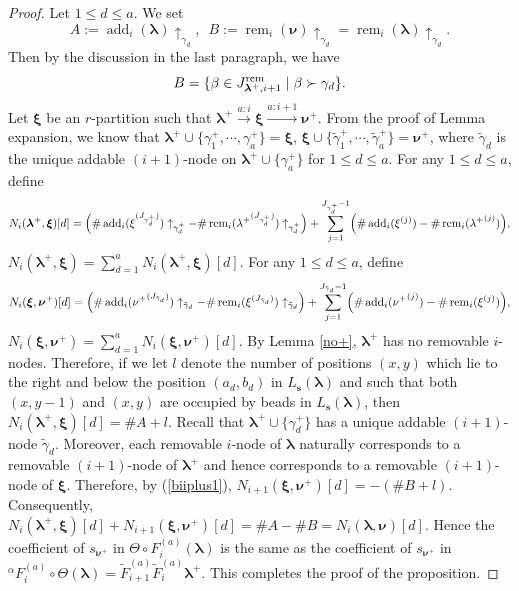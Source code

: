 \documentclass[a4paper,10pt]{amsart}
\theoremstyle{plain}
\def\bs{{\boldsymbol{s}}}
\def\bxi{{\boldsymbol \xi}}
\def\blam{{\boldsymbol \lambda}}
\def\bnu{{\boldsymbol \nu}}
\newcommand{\add}{\operatorname{add}}
\newcommand{\rem}{\operatorname{rem}}
\theoremstyle{plain}
\numberwithin{equation}{section}
\newenvironment{equa}
  {\refstepcounter{theorem}%
   \renewcommand\theequation{\thetheorem}%
   \begin{equation}}
  {\end{equation}}
\begin{document}
\begin{proof}
Let $1\leq d\leq a$. We set $$
A:=\add_i(\blam)\uparrow_{\gamma_d},\,\,\, B:=\rem_{i}(\bnu)\uparrow_{\gamma_d}=\rem_{i}(\blam) \uparrow_{\gamma_d}. $$
Then by the discussion in the last paragraph, we have \begin{equa}\label{biiplus1}B=\{\beta\in J_{\blam^+,i+1}^{\rm{rem}}\mid\beta\succ{\gamma_d}\}.\end{equa} Let $\bxi$ be an $r$-partition such that $\blam^+\xrightarrow{a:i} \bxi \xrightarrow{a:i+1} \bnu^+$.
From the proof of Lemma {expansion}, we know that $\blam^+\cup \{\gamma^+_1, \cdots, \gamma^+_a\}=\bxi$, $\bxi\cup \{\tilde \gamma^+_1, \cdots, \tilde \gamma^+_a\}=\bnu^+$, where $\tilde \gamma_d$ is the unique addable $(i+1)$-node on $\blam^+\cup \{\gamma^+_a\}$ for $1\le d\le a$.
For any $1\le d\le a$, define
$$N_i(\blam^+, \bxi)[d]=\Bigl(\#\add_i (\xi^{(J_{\gamma^+_d})} )\uparrow_{\gamma^+_d}-\#\rem_i ({\lambda^+}^{(J_{\gamma^+_d})})\uparrow_{\gamma^+_d}\Bigr)+ \sum^{J_{\gamma^+_d}-1}_{j=1}\Bigl(\#\add_i (\xi^{(j)})-\#\rem_i ({\lambda^+}^{(j)})\Bigr),$$
$N_i(\blam^+, \bxi)=\sum_{d=1}^a N_i(\blam^+, \bxi)[d].$
For any $1\le d\le a$, define
$$N_i(\bxi, \bnu^+)[d]=\Bigl(\#\add_i ({\nu^+}^{(J_{\tilde \gamma_d})} )\uparrow_{\tilde \gamma_d}-\#\rem_i ({\xi}^{(J_{\tilde \gamma_d})})\uparrow_{\tilde \gamma_d}\Bigr)+ \sum^{J_{\tilde \gamma_d}-1}_{j=1}\Bigl(\#\add_i ({\nu^+}^{(j)})-\#\rem_i ({\xi}^{(j)})\Bigr),$$
$N_i(\bxi, \bnu^+)=\sum_{d=1}^a N_i(\bxi, \bnu^+)[d].$
By Lemma \ref{no+}, $\blam^+$ has no removable $i$-nodes.
Therefore, if we let $l$ denote the number of positions \((x,y)\) which lie to the right and below the position \((a_d,b_d)\) in \(L_\bs(\blam)\) and such that both \((x,y-1)\) and \((x,y)\) are occupied by beads in \(L_\bs(\blam)\), then $N_i(\blam^+, \bxi)[d]=\#A+l$.
Recall that $\blam^{+}\cup\{\gamma^+_d\}$ has a unique addable $(i+1)$-node $\tilde \gamma_d$.
Moreover, each removable $i$-node of $\blam$ naturally corresponds to a removable $(i+1)$-node of $\blam^+$ and hence corresponds to a removable $(i+1)$-node of $\bxi$. Therefore, by (\ref{biiplus1}), $N_{i+1}(\bxi, \bnu^+)[d]=-(\#B+l)$. Consequently, $N_i(\blam^+,\bxi)[d]+N_{i+1} (\bxi,\bnu^+)[d]=\#A-\#B=N_i(\blam, \bnu)[d]$.
Hence the coefficient of $s_{\bnu^+}$ in $\varTheta\circ F_i^{(a)}(\blam)$ is the same as the coefficient of $s_{\bnu^+}$ in ${^\alpha}\!F_i^{(a)}\circ \varTheta(\blam)=\tilde{F}^{(a)}_{i+1}\tilde{F}^{(a)}_i \blam^+$.
This completes the proof of the proposition.
\end{proof}
\end{document}
